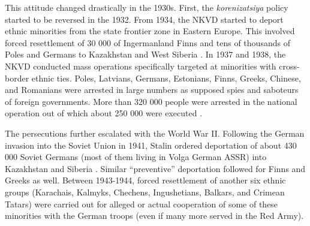 This attitude changed drastically in the 1930s.
First, the  \emph{korenizatsiya} policy started to be reversed in the 1932.
From 1934, the NKVD started to deport ethnic minorities from the state frontier zone in Eastern Europe. This involved forced resettlement of  30 000 of Ingermanland Finns and tens of thousands of Poles and Germans to  Kazakhstan and West Siberia  \citep[p. 95]{polian_against_2003}.
In 1937 and 1938, the NKVD conducted mass operations specifically
targeted at minorities with cross-border ethnic ties. 
Poles, Latvians, Germans, Estonians, Finns, Greeks, Chinese, and Romanians were arrested in large numbers as supposed spies and saboteurs of foreign governments.
More than 320 000 people were arrested in the national operation out of which about 250 000 were executed \citep[p. 855]{martin_origins_1998}. %

The persecutions  further escalated with the World War II. Following the German invasion into the Soviet Union in 1941, Stalin ordered deportation of about 430 000 Soviet Germans (most of them living in Volga German ASSR)  into Kazakhstan and Siberia \citep[p. 134]{polian_against_2003}. Similar \enquote{preventive} deportation followed for  Finns and Greeks as well. Between 1943-1944, forced resettlement of another six ethnic groups (Karachais, Kalmyks, Chechens, Ingushetians, Balkars, and Crimean Tatars) were carried out for alleged or actual cooperation of some of these minorities with the German troops (even if many more served in the Red Army). 

